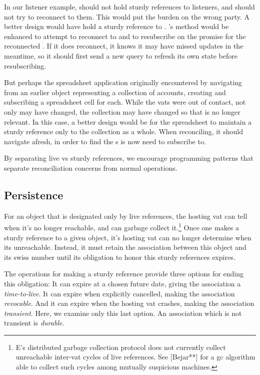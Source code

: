 \documentclass{llncs}
\begin{document}
In our listener example,  should not hold sturdy references
to listeners, and should not try to reconnect to them. This would put
the burden on the wrong party. A better design would have 
hold a sturdy reference to . 's
 method would be enhanced to attempt to
reconnect to  and to resubscribe  on the promise for
the reconnected . If it does reconnect, it knows it may have
missed updates in the meantime, so it should first send a new
 query to refresh its own state before resubscribing.

But perhaps the spreadsheet application originally encountered
 by navigating from an earlier object representing a
collection of accounts, creating and subscribing a spreadsheet cell
for each. While the vats were out of contact, not only may 
have changed, the collection may have changed so that  is no
longer relevant. In this case, a better design would be for the
spreadsheet to maintain a sturdy reference only to the collection as a
whole. When reconciling, it should navigate afresh, in order to find
the s is now need to subscribe to.

By separating live vs sturdy references, we encourage programming
patterns that separate reconciliation concerns from normal operations.

\subsection{Persistence}

For an object that is designated only by live references, the hosting
vat can tell when it's no longer reachable, and can garbage collect
it.\footnote{E's distributed garbage collection protocol does not
currently collect unreachable inter-vat cycles of live references. See
[Bejar**] for a gc algorithm able to collect such cycles among
mutually suspicious machines.} Once one makes a sturdy reference to a
given object, it's hosting vat can no longer determine when its
unreachable. Instead, it must retain the association between this
object and its swiss number until its obligation to honor this sturdy
references expires.

The operations for making a sturdy reference provide three options for
ending this obligation: It can expire at a chosen future date, giving
the association a \emph{time-to-live}. It can expire when explicitly
cancelled, making the association \emph{revocable}. And it can expire
when the hosting vat crashes, making the association
\emph{transient}. Here, we examine only this last option. An
association which is not transient is \emph{durable}.
\end{document}
